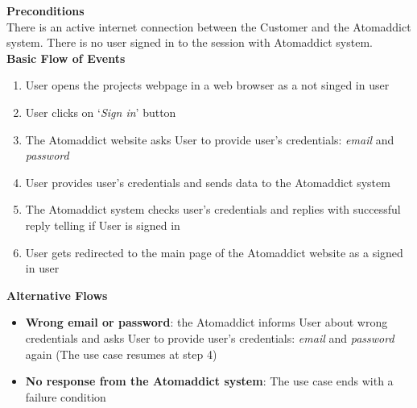 \documentclass[12pt]{article}
\begin{document}
\vspace{0.5cm}


\textbf{Preconditions}\\
There is an active internet connection between the Customer and the Atomaddict system. There is no user signed in to the session with Atomaddict system.\\


\textbf{Basic Flow of Events}\\

\begin{enumerate}

    \item User opens the projects webpage in a web browser as a not singed in user

    \item User clicks on `\emph{Sign in}' button 

    \item The Atomaddict website asks User to provide user's credentials: \emph{email} and \emph{password}

    \item User provides user's credentials and sends data to the Atomaddict system

    \item The Atomaddict system checks user's credentials and replies with successful reply telling if User is signed in

    \item User gets redirected to the main page of the Atomaddict website as a signed in user

\end{enumerate}

\vspace{0.5cm}


\textbf{Alternative Flows}\\

\begin{itemize}

    \item \textbf{Wrong email or password}: the Atomaddict informs User about wrong credentials and asks User to provide user's credentials: \emph{email} and \emph{password} again (The use case resumes at step 4)

    \item \textbf{No response from the Atomaddict system}: The use case ends with a failure condition

\end{itemize}
\end{document}
